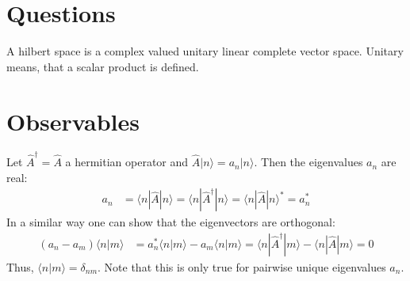 \documentclass[english, parskip=full]{scrartcl}
\title{\titel}
\author{\autor}
\date{\today}
\newcommand{\brak}{}
\newcommand{\braket}{}
\newcommand{\Ket}{}
\begin{document}
\maketitle  %

\section{Questions}
A hilbert space is a complex valued unitary linear complete vector space. Unitary means, that a scalar product is defined.
\section{Observables}
Let $\hat{A}^\dagger=\hat{A}$ a hermitian operator and $\hat{A}\Ket | {n} \rangle=a_n\Ket | {n} \rangle$. Then the eigenvalues $a_n$ are real:
\begin{align*}
a_n&=\braket\langle {n} | {\hat{A}} | {n}\rangle=\braket\langle {n} | {\hat{A}^\dagger} | {n}\rangle=\braket\langle {n} | {\hat{A}} | {n}\rangle^\ast=a_n^\ast
\end{align*}
In a similar way one can show that the eigenvectors are orthogonal:
\begin{align*}
(a_n-a_m)\brak\langle {n}| {m}\rangle&=a_n^\ast\brak\langle {n}| {m}\rangle-a_m\brak\langle {n}| {m}\rangle=\braket\langle {n} | {\hat{A}^\dagger} | {m}\rangle-\braket\langle {n} | {\hat{A}} | {m}\rangle=0
\end{align*}
Thus, $\brak\langle {n}| {m}\rangle=\delta_{nm}$. Note that this is only true for pairwise unique eigenvalues $a_n$.
\end{document}
